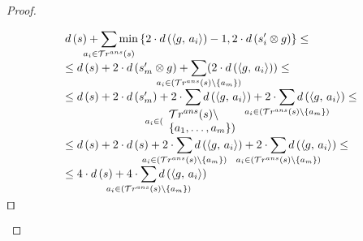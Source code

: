 \begin{proof}
\begin{enumerate}
   \[ \begin{array}{l}
  d\,(s) + \smashoperator[lr]{\sum\limits_{a_i \in \tra{s}}} \min\,\{2\cdot d\,(\taskst{g}{a_i}) - 1, 2\cdot d\,(s'_i \otimes g)\}  \le \\
  \le d\,(s) + 2 \cdot d\,(s'_m \otimes g) + \smashoperator[lr]{\sum\limits_{a_i \in (\tra{s} \setminus \{a_m\})}} (2\cdot d\,(\taskst{g}{a_i})) \le \\
  \le d\,(s) + 2 \cdot d\,(s'_m) + 2\cdot\smashoperator[lr]{\sum\limits_{a_i \in (\begin{array}{l} \tra{s} \setminus \\ \{a_1, \dots, a_m\}) \end{array}}} d\,(\taskst{g}{a_i}) + 2\cdot\smashoperator[lr]{\sum\limits_{a_i \in (\tra{s} \setminus \{a_m\})}} d\,(\taskst{g}{a_i}) \le \\
  \le d\,(s) + 2 \cdot d\,(s) + 2\cdot\smashoperator[lr]{\sum\limits_{a_i \in (\tra{s} \setminus \{a_m\})}} d\,(\taskst{g}{a_i}) + 2\cdot\smashoperator[lr]{\sum\limits_{a_i \in (\tra{s} \setminus \{a_m\})}} d\,(\taskst{g}{a_i}) \le \\
  \le 4 \cdot d\,(s) + 4\cdot\smashoperator[lr]{\sum\limits_{a_i \in (\tra{s} \setminus \{a_m\})}} d\,(\taskst{g}{a_i}) \\
  \end{array} \] $\qed$

\end{enumerate}

\end{proof}


